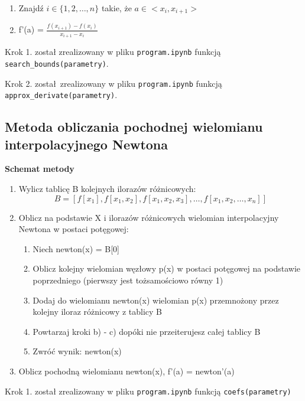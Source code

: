 \documentclass[a4paper,10pt]{article}
\begin{document}
   \begin{enumerate}
    \item Znajdź $i \in \{1, 2, \dots, n\}$ takie, że $a \in <x_i, x_{i+1}>$
    \item f'(a) = $\frac{f(x_{i+1}) - f(x_i)}{x_{i+1} - x_i}$
   \end{enumerate}
   
   \indent Krok 1. został zrealizowany w pliku \texttt{program.ipynb} funkcją
   \texttt{search\_bounds(parametry)}.
   \par
   \indent Krok 2. został zrealizowany w pliku \texttt{program.ipynb} funkcją
   \texttt{approx\_derivate(parametry)}.
   \par
   
   \subsection{Metoda obliczania pochodnej wielomianu interpolacyjnego
   Newtona}
   \begin{center}
    \textbf{Schemat metody}
   \end{center}
   
   \begin{enumerate}
    \item Wylicz tablicę B kolejnych ilorazów różnicowych:
    \[B = [f[x_1], f[x_1, x_2], f[x_1, x_2, x_3], \dots, f[x_1, x_2, \dots, x_n]]\]
    \item Oblicz na podstawie X i ilorazów różnicowych wielomian interpolacyjny
    Newtona w postaci potęgowej:
    \begin{enumerate}
     \item Niech newton(x) = B[0]
     \item Oblicz kolejny wielomian węzłowy p(x) w postaci potęgowej
     na podstawie poprzedniego (pierwszy jest tożsamościowo równy 1)
     \item Dodaj do wielomianu newton(x) wielomian p(x) przemnożony
     przez kolejny iloraz różnicowy z tablicy B
     \item Powtarzaj kroki b) - c) dopóki nie przeiterujesz całej tablicy B
     \item Zwróć wynik: newton(x)
    \end{enumerate}
    
    \item Oblicz pochodną wielomianu newton(x), f'(a) = newton'(a)
   \end{enumerate}
   
   Krok 1. został zrealizowany w pliku \texttt{program.ipynb} funkcją
   \texttt{coefs(parametry)}
   
\end{document}
